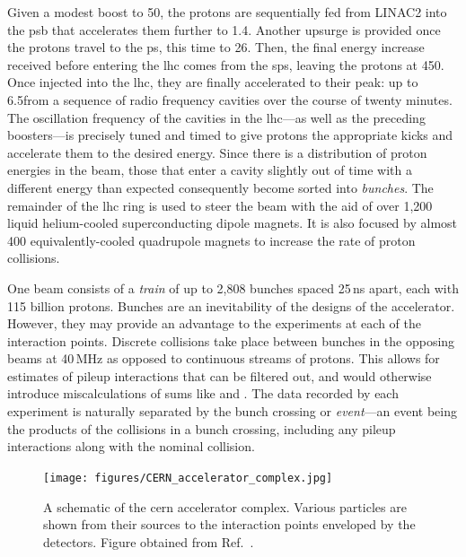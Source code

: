 Given a modest boost to 50\MeV, the protons are sequentially fed from LINAC2 into the \acrfull{psb} that accelerates them further to 1.4\GeV. Another upsurge is provided once the protons travel to the \acrfull{ps}, this time to 26\GeV. Then, the final energy increase received before entering the \acrshort{lhc} comes from the \acrfull{sps}, leaving the protons at 450\GeV. Once injected into the \acrshort{lhc}, they are finally accelerated to their peak: up to 6.5\TeV from a sequence of radio frequency cavities over the course of twenty minutes. The oscillation frequency of the cavities in the \acrshort{lhc}---as well as the preceding boosters---is precisely tuned and timed to give protons the appropriate kicks and accelerate them to the desired energy. Since there is a distribution of proton energies in the beam, those that enter a cavity slightly out of time with a different energy than expected consequently become sorted into \emph{bunches}. The remainder of the \acrshort{lhc} ring is used to steer the beam with the aid of over 1,200 liquid helium-cooled superconducting dipole magnets. It is also focused by almost 400 equivalently-cooled quadrupole magnets to increase the rate of proton collisions.

One beam consists of a \emph{train} of up to 2,808 bunches spaced 25\,ns apart, each with 115 billion protons. Bunches are an inevitability of the designs of the accelerator. However, they may provide an advantage to the experiments at each of the interaction points. Discrete collisions take place between bunches in the opposing beams at 40\,MHz as opposed to continuous streams of protons. This allows for estimates of \gls{pileup} interactions that can be filtered out, and would otherwise introduce miscalculations of sums like \ptmiss and \HT. The data recorded by each experiment is naturally separated by the bunch crossing or \emph{event}---an event being the products of the collisions in a bunch crossing, including any \gls{pileup} interactions along with the nominal collision.

\begin{figure}[htbp]
    \centering
    \texttt{[image: figures/CERN\_accelerator\_complex.jpg]}
    \caption[A schematic of the \acrshort{cern} accelerator complex]{A schematic of the \acrshort{cern} accelerator complex. Various particles are shown from their sources to the interaction points enveloped by the detectors. Figure obtained from Ref.~.}
    \label{fig:cern_accelerator_complex}
\end{figure}

